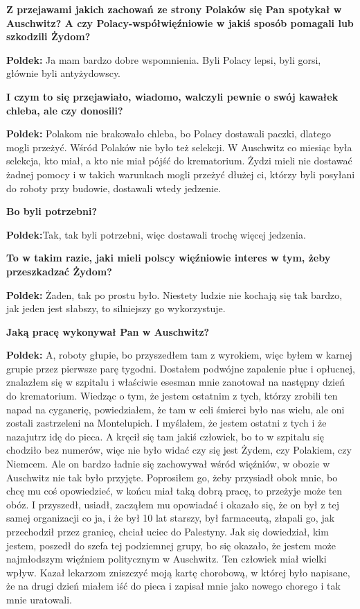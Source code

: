 \textbf{Z przejawami jakich zachowań ze strony Polaków się Pan spotykał w Auschwitz? A czy Polacy-współwięźniowie w jakiś sposób pomagali lub szkodzili Żydom?}\par
\textbf{Poldek:} Ja mam bardzo dobre wspomnienia. Byli Polacy lepsi, byli gorsi, głównie byli antyżydowscy.\par
\textbf{I czym to się przejawiało, wiadomo, walczyli pewnie o swój kawałek chleba, ale czy donosili?}\par  
\textbf{Poldek:} Polakom nie brakowało chleba, bo Polacy dostawali paczki, dlatego mogli przeżyć. Wśród Polaków nie było też selekcji. W Auschwitz co miesiąc była selekcja, kto miał, a kto nie miał pójść do krematorium. Żydzi mieli nie dostawać żadnej pomocy i w takich warunkach mogli przeżyć dłużej ci, którzy byli posyłani do roboty przy budowie, dostawali wtedy jedzenie.\par 
\textbf{Bo byli potrzebni?}\par 
\textbf{Poldek:}Tak, tak byli potrzebni, więc dostawali trochę więcej jedzenia.\par
\textbf{To w takim razie, jaki mieli polscy więźniowie interes w tym, żeby przeszkadzać Żydom?}\par 
\textbf{Poldek:} Żaden, tak po prostu było. Niestety ludzie nie kochają się tak bardzo, jak jeden jest słabszy, to silniejszy go wykorzystuje.\par
\textbf{Jaką pracę wykonywał Pan w Auschwitz?}\par 
\textbf{Poldek:} A, roboty głupie, bo przyszedłem tam z wyrokiem, więc byłem w karnej grupie przez pierwsze parę tygodni. Dostałem podwójne zapalenie płuc i opłucnej, znalazłem się w szpitalu i właściwie esesman mnie zanotował na następny dzień do krematorium. Wiedząc o tym, że jestem ostatnim z tych, którzy zrobili ten napad na cyganerię, powiedziałem, że tam w celi śmierci było nas wielu, ale oni zostali zastrzeleni na Montelupich. I myślałem, że jestem ostatni z tych i że nazajutrz idę do pieca. A kręcił się tam jakiś człowiek, bo to w szpitalu się chodziło bez numerów, więc nie było widać czy się jest Żydem, czy Polakiem, czy Niemcem. Ale on bardzo ładnie się zachowywał wśród więźniów, w obozie w Auschwitz nie tak było przyjęte. Poprosiłem go, żeby przysiadł obok mnie, bo chcę mu coś opowiedzieć, w końcu miał taką dobrą pracę, to przeżyje może ten obóz. I przyszedł, usiadł, zacząłem mu opowiadać i okazało się, że on był z tej samej organizacji co ja, i że był 10 lat starszy, był farmaceutą, złapali go, jak przechodził przez granicę, chciał uciec do Palestyny. Jak się dowiedział, kim jestem, poszedł do szefa tej podziemnej grupy, bo się okazało, że jestem może najmłodszym więźniem politycznym w Auschwitz. Ten człowiek miał wielki wpływ. Kazał lekarzom zniszczyć moją kartę chorobową, w której było napisane, że na drugi dzień miałem iść do pieca i zapisał mnie jako nowego chorego i tak mnie uratowali.\par  
